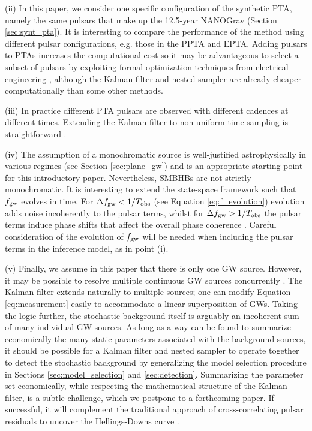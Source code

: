 \documentclass[fleqn,usenatbib,useAMS]{mnras}
\begin{document}
(ii) In this paper, we consider one specific configuration of the synthetic PTA, namely the same pulsars that make up the 12.5-year NANOGrav (Section \ref{sec:synt_pta}). It is interesting to compare the performance of the method using different pulsar configurations, e.g. those in the PPTA and EPTA. Adding pulsars to PTAs increases the computational cost so it may be advantageous to select a subset of pulsars by exploiting formal optimization techniques from electrical engineering \citep{2023MNRAS.518.1802S}, although the Kalman filter and nested sampler are already cheaper computationally than some other methods. \newline 


(iii) In practice different PTA pulsars are observed with different cadences at different times. Extending the Kalman filter to non-uniform time sampling is straightforward \citep{zarchan2000fundamentals}. \newline 



(iv) The assumption of a monochromatic source is well-justified astrophysically in various regimes (see Section \ref{sec:plane_gw}) and is an appropriate starting point for this introductory paper. Nevertheless, SMBHBs are not strictly monochromatic. It is interesting to extend the state-space framework such that $f_{\rm gw}$ evolves in time. For $\Delta f_{\rm gw} < 1 / T_{\rm obs}$ (see Equation \eqref{eq:f_evolution}) evolution adds noise incoherently to the pulsar terms, whilst for $\Delta f_{\rm gw} > 1 / T_{\rm obs}$ the pulsar terms induce phase shifts that affect the overall phase coherence \citep{Sesana2010,Perrodin2018}. Careful consideration of the evolution of $f_{\rm gw}$ will be needed when including the pulsar terms in the inference model, as in point (i). \newline 


(v) Finally, we assume in this paper that there is only one GW source. However, it may be possible to resolve multiple continuous GW sources concurrently \citep{PhysRevD.85.044034}. The Kalman filter extends naturally to multiple sources; one can modify Equation \eqref{eq:measurement} easily to accommodate a linear superposition of GWs. Taking the logic further, the stochastic background itself is arguably an incoherent sum of many individual GW sources. As long as a way can be found to summarize economically the many static parameters associated with the background sources, it should be possible for a Kalman filter and nested sampler to operate together to detect the stochastic background by generalizing the model selection procedure in Sections \ref{sec:model_selection} and \ref{sec:detection}. Summarizing the parameter set economically, while respecting the mathematical structure of the Kalman filter, is a subtle challenge, which we postpone to a forthcoming paper. If successful, it will complement the traditional approach of cross-correlating pulsar residuals to uncover the Hellings-Downs curve \citep{Hellings,2023ApJ...951L...8A}. \newline 
\end{document}
